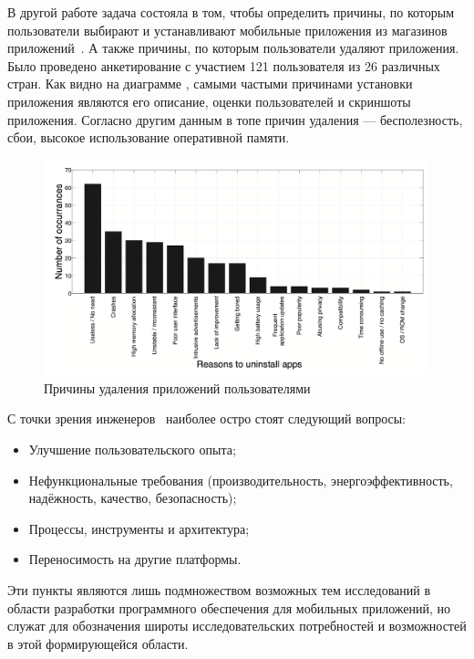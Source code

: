 \documentclass[a4paper,14pt]{extarticle} %
\begin{document}
	В другой работе задача состояла в том, чтобы определить причины, по которым пользователи выбирают и устанавливают мобильные приложения из магазинов приложений~\parencite{ickin2017users}. А также причины, по которым пользователи удаляют приложения. Было проведено анкетирование с участием 121 пользователя из 26 различных стран. Как видно на диаграмме \ris{\ref{fig:install_reasons}}, самыми частыми причинами установки приложения являются его описание, оценки пользователей и скриншоты приложения. Согласно другим данным \ris{\ref{fig:delete_reasons}} в топе причин удаления --- бесполезность, сбои, высокое использование оперативной памяти.
	
	\begin{figure}[h]
		\includegraphics[width=\textwidth]{delete_reasons}
		\caption{Причины удаления приложений пользователями}
		\label{fig:delete_reasons}
	\end{figure}
	
	С точки зрения инженеров~\parencite{wasserman2010software} наиболее остро стоят следующий вопросы: 
	\begin{itemize}
		\item Улучшение пользовательского опыта; 
		\item Нефункциональные требования (производительность, энергоэффективность, надёжность, качество, безопасность);
		\item Процессы, инструменты и архитектура; 
		\item Переносимость на другие платформы. 
	\end{itemize}

	Эти пункты являются лишь подмножеством возможных тем исследований в области разработки программного обеспечения для мобильных приложений, но служат для обозначения широты исследовательских потребностей и возможностей в этой формирующейся области.
	
\end{document}
